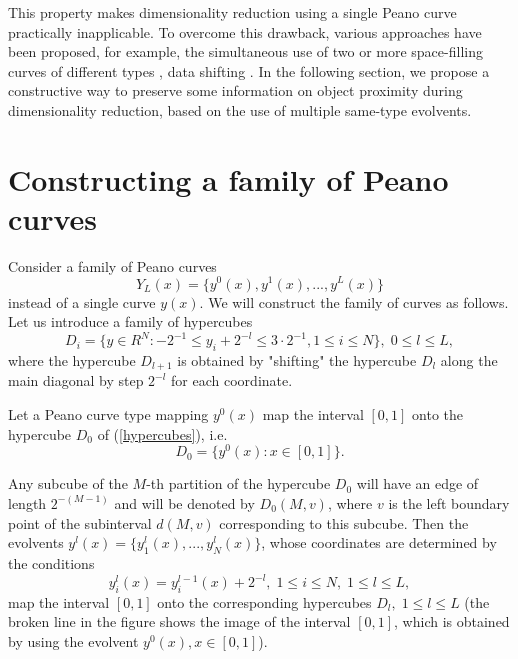 \documentclass[sensors,article,submit,moreauthors,pdftex]{Definitions/mdpi}
\begin{document}
This property makes dimensionality reduction using a single Peano curve practically inapplicable. To overcome this drawback, various approaches have been proposed, for example, the simultaneous use of two or more space-filling curves of different types \cite{Scott1999}, data shifting \cite{Liao2001}. In the following section, we propose a constructive way to preserve some information on object proximity during dimensionality reduction, based on the use of multiple same-type evolvents.

\section{Constructing a family of Peano curves}

Consider a family of Peano curves
\begin{equation}
Y_L(x)=\{ y^0(x), y^1(x), ..., y^L(x) \}
\end{equation} 
instead of a single curve $y(x)$. We will construct the family of curves as follows. Let us introduce a family of hypercubes
\begin{equation}\label{hypercubes}
D_i = \{ y \in R^N: -2^{-1} \leq y_i + 2^{-l} \leq 3 \cdot 2^{-1},  1 \leq i \leq N \}, \; 0 \leq l \leq L,
\end{equation} 
where the hypercube $D_{l+1}$ is obtained by "shifting" the hypercube $D_l$ along the main diagonal by step $2^{-l}$ for each coordinate.

Let a Peano curve type mapping $y^0(x)$ map the interval $[0,1]$ onto the hypercube $D_0$ of (\ref{hypercubes}), i.e.
\begin{equation}\label{hypercubeD0}
D_0 = \{y^0(x): x \in [0, 1] \}.
\end{equation} 

Any subcube of the $M$-th partition of the hypercube $D_0$ will have an edge of length $2^{-(M-1)}$ and will be denoted by $D_0(M, v)$, where $v$ is the left boundary point of the subinterval $d(M, v)$ corresponding to this subcube. Then the evolvents $y^l(x)=\{y_1^l(x), ..., y_N^l(x)\}$, whose coordinates are determined by the conditions
\begin{equation}\label{maps}
y_i^l(x) = y_i^{l-1}(x) + 2^{-l}, \; 1 \leq i \leq N, \; 1 \leq l \leq L,
\end{equation} 
map the interval $[0,1]$ onto the corresponding hypercubes  $D_l, \; 1 \leq l \leq L$ (the broken line in the figure shows the image of the interval $[0,1]$, which is obtained by using the evolvent $y^0(x), x \in [0,1]$).
\end{document}
